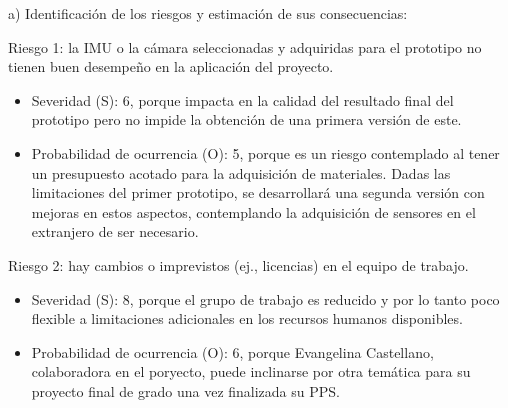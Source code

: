 \documentclass[
11pt, %
codirector, %
]{charter}
\begin{document}


 

 


a) Identificación de los riesgos y estimación de sus consecuencias:

Riesgo 1: la IMU o la cámara seleccionadas y adquiridas para el prototipo no tienen buen desempeño en la aplicación del proyecto.
\begin{itemize}
	\item Severidad (S): 6, porque impacta en la calidad del resultado final del prototipo pero no impide la obtención de una primera versión de este. 
	\item Probabilidad de ocurrencia (O): 5, porque es un riesgo contemplado al tener un presupuesto acotado para la adquisición de materiales. Dadas las limitaciones del primer prototipo, se desarrollará una segunda versión con mejoras en estos aspectos, contemplando la adquisición de sensores en el extranjero de ser necesario.
\end{itemize}

Riesgo 2: hay cambios o imprevistos (ej., licencias) en el equipo de trabajo.
\begin{itemize}
	\item Severidad (S): 8, porque el grupo de trabajo es reducido y por lo tanto poco flexible a limitaciones adicionales en los recursos humanos disponibles.
	\item Probabilidad de ocurrencia (O): 6, porque Evangelina Castellano, colaboradora en el poryecto, puede inclinarse por otra temática para su proyecto final de grado una vez finalizada su PPS.
\end{itemize}
\end{document}

